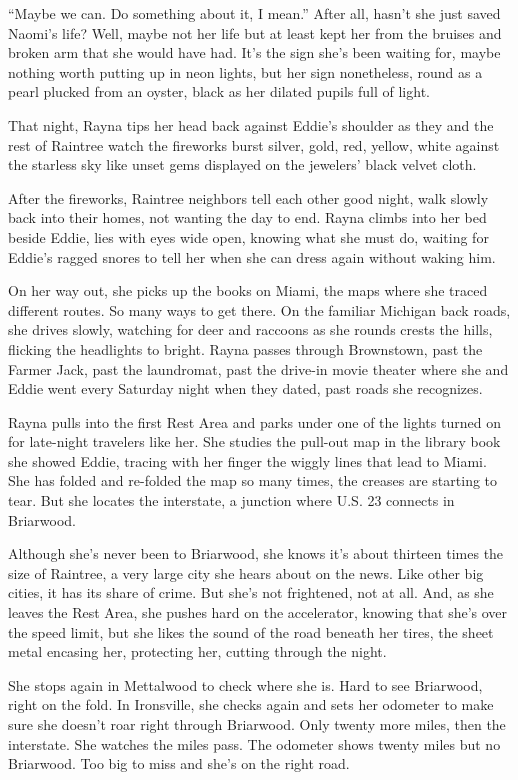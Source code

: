 \documentclass[twoside,10pt]{book}
\begin{document}
``Maybe we can. Do something about it, I mean.'' After all, hasn't she
just saved Naomi's life? Well, maybe not her life but at least kept her
from the bruises and broken arm that she would have had. It's the sign
she's been waiting for, maybe nothing worth putting up in neon lights,
but her sign nonetheless, round as a pearl plucked from an oyster, black
as her dilated pupils full of light.

That night, Rayna tips her head back against Eddie's shoulder as they
and the rest of Raintree watch the fireworks burst silver, gold, red,
yellow, white against the starless sky like unset gems displayed on the
jewelers' black velvet cloth.

After the fireworks, Raintree neighbors tell each other good night, walk
slowly back into their homes, not wanting the day to end. Rayna climbs
into her bed beside Eddie, lies with eyes wide open, knowing what she
must do, waiting for Eddie's ragged snores to tell her when she can
dress again with­out waking him.

On her way out, she picks up the books on Miami, the maps where she
traced different routes. So many ways to get there. On the familiar
Michigan back roads, she drives slowly, watching for deer and raccoons
as she rounds crests the hills, flicking the headlights to bright. Rayna
passes through Brownstown, past the Farmer Jack, past the laundromat,
past the drive-in movie theater where she and Eddie went every Saturday
night when they dated, past roads she recognizes.

Rayna pulls into the first Rest Area and parks under one of the lights
turned on for late-night travelers like her. She studies the pull-out
map in the library book she showed Eddie, tracing with her finger the
wiggly lines that lead to Miami. She has folded and re-folded the map so
many times, the creases are starting to tear. But she locates the
interstate, a junction where U.S. 23 connects in Briarwood.

Although she's never been to Briarwood, she knows it's about thirteen
times the size of Raintree, a very large city she hears about on the
news. Like other big cities, it has its share of crime. But she's not
frightened, not at all. And, as she leaves the Rest Area, she pushes
hard on the accelerator, knowing that she's over the speed limit, but
she likes the sound of the road beneath her tires, the sheet metal
encasing her, protecting her, cutting through the night.

She stops again in Mettalwood to check where she is. Hard to see
Briarwood, right on the fold. In Ironsville, she checks again and sets
her odometer to make sure she doesn't roar right through Briarwood. Only
twenty more miles, then the interstate. She watches the miles pass. The
odometer shows twenty miles but no Briarwood. Too big to miss and she's
on the right road.
\end{document}
